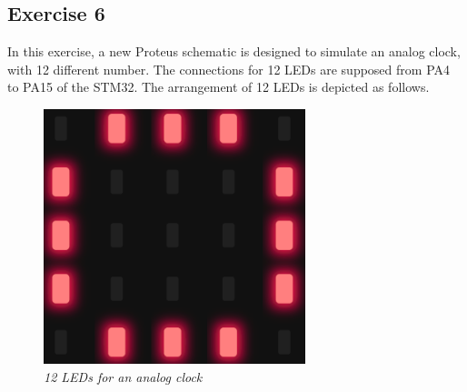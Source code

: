 \subsection{Exercise 6}
In this exercise, a new Proteus schematic is designed to simulate an analog clock, with 12 different number. The connections for 12 LEDs are supposed from PA4 to PA15 of the STM32. The arrangement of 12 LEDs is depicted as follows.

\begin{figure}[H]
    \centering
    \includegraphics[width=3in]{source/picture/bai_1/pic4.PNG}
    \caption{\textit{12 LEDs for an analog clock}}
    \label{bai1_pic3}
\end{figure}

